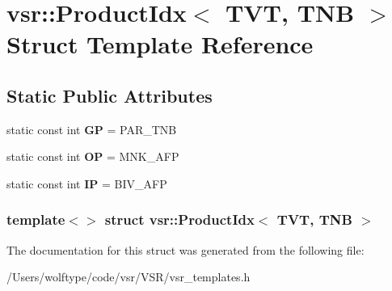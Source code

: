 \hypertarget{structvsr_1_1_product_idx_3_01_t_v_t_00_01_t_n_b_01_4}{\section{vsr\-:\-:Product\-Idx$<$ T\-V\-T, T\-N\-B $>$ Struct Template Reference}
\label{structvsr_1_1_product_idx_3_01_t_v_t_00_01_t_n_b_01_4}
}
\subsection*{Static Public Attributes}
\begin{DoxyCompactItemize}
\item 
\hypertarget{structvsr_1_1_product_idx_3_01_t_v_t_00_01_t_n_b_01_4_a092f7d2660e86891fa4739e1b9557628}{static const int {\bfseries G\-P} = P\-A\-R\-\_\-\-T\-N\-B}\label{structvsr_1_1_product_idx_3_01_t_v_t_00_01_t_n_b_01_4_a092f7d2660e86891fa4739e1b9557628}

\item 
\hypertarget{structvsr_1_1_product_idx_3_01_t_v_t_00_01_t_n_b_01_4_ab22201f1dd0657fa3362733d3d285c56}{static const int {\bfseries O\-P} = M\-N\-K\-\_\-\-A\-F\-P}\label{structvsr_1_1_product_idx_3_01_t_v_t_00_01_t_n_b_01_4_ab22201f1dd0657fa3362733d3d285c56}

\item 
\hypertarget{structvsr_1_1_product_idx_3_01_t_v_t_00_01_t_n_b_01_4_a0ea0a15d30391580adc109e156b89b8f}{static const int {\bfseries I\-P} = B\-I\-V\-\_\-\-A\-F\-P}\label{structvsr_1_1_product_idx_3_01_t_v_t_00_01_t_n_b_01_4_a0ea0a15d30391580adc109e156b89b8f}

\end{DoxyCompactItemize}
\subsubsection*{template$<$$>$ struct vsr\-::\-Product\-Idx$<$ T\-V\-T, T\-N\-B $>$}



The documentation for this struct was generated from the following file\-:\begin{DoxyCompactItemize}
\item 
/\-Users/wolftype/code/vsr/\-V\-S\-R/vsr\-\_\-templates.\-h\end{DoxyCompactItemize}

